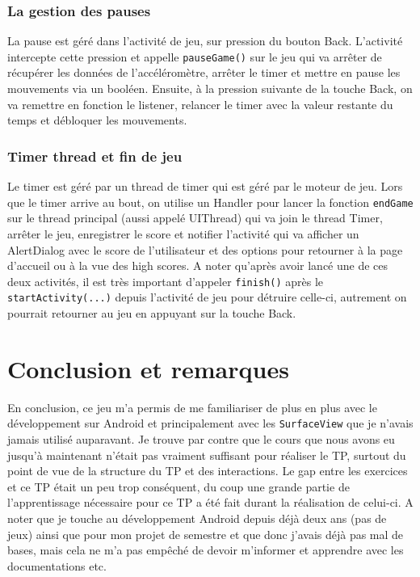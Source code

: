\documentclass{article}
\begin{document}
\subsubsection{La gestion des pauses}
La pause est géré dans l'activité de jeu, sur pression du bouton Back. L'activité intercepte cette pression et appelle \verb+pauseGame()+ sur le jeu qui va arrêter de récupérer les données de l'accéléromètre, arrêter le timer et mettre en pause les mouvements via un booléen. Ensuite, à la pression suivante de la touche Back, on va remettre en fonction le listener, relancer le timer avec la valeur restante du temps et débloquer les mouvements.
\subsubsection{Timer thread et fin de jeu}
Le timer est géré par un thread de timer qui est géré par le moteur de jeu. Lors que le timer arrive au bout, on utilise un Handler pour lancer la fonction \verb+endGame+ sur le thread principal (aussi appelé UIThread) qui va join le thread Timer, arrêter le jeu, enregistrer le score et notifier l'activité qui va afficher un AlertDialog avec le score de l'utilisateur et des options pour retourner à la page d'accueil ou à la vue des high scores. A noter qu'après avoir lancé une de ces deux activités, il est très important d'appeler \verb+finish()+ après le \verb+startActivity(...)+ depuis l'activité de jeu pour détruire celle-ci, autrement on pourrait retourner au jeu en appuyant sur la touche Back.
\section{Conclusion et remarques}
En conclusion, ce jeu m'a permis de me familiariser de plus en plus avec le développement sur Android et principalement avec les \verb+SurfaceView+ que je n'avais jamais utilisé auparavant. Je trouve par contre que le cours que nous avons eu jusqu'à maintenant n'était pas vraiment suffisant pour réaliser le TP, surtout du point de vue de la structure du TP et des interactions. Le gap entre les exercices et ce TP était un peu trop conséquent, du coup une grande partie de l'apprentissage nécessaire pour ce TP a été fait durant la réalisation de celui-ci. A noter que je touche au développement Android depuis déjà deux ans (pas de jeux) ainsi que pour mon projet de semestre et que donc j'avais déjà pas mal de bases, mais cela ne m'a pas empêché de devoir m'informer et apprendre avec les documentations etc.
\end{document}

